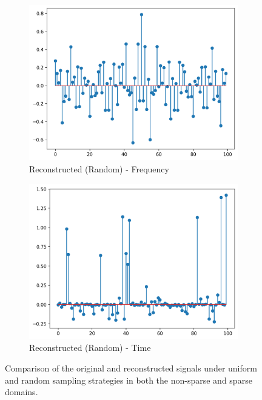 \documentclass[11pt]{article}
\begin{document}
\begin{figure}[H]
    \begin{subfigure}{.45\textwidth}
        \centering
        \includegraphics[width=\linewidth]{figs/q2b_randomly_recovered_signal_fft.png}
        \caption{Reconstructed (Random) - Frequency}
        \label{fig:random_reconstructed_signal_fft}
    \end{subfigure}%
    \begin{subfigure}{.45\textwidth}
        \centering
        \includegraphics[width=\linewidth]{figs/q2b_randomly_recovered_signal.png}
        \caption{Reconstructed (Random) - Time }
        \label{fig:random_reconstructed_signal}
    \end{subfigure}
    
    \caption{Comparison of the original and reconstructed signals under uniform and random sampling strategies in both the non-sparse and sparse domains.}
    \label{fig:full_comparison}
\end{figure}
\end{document}
